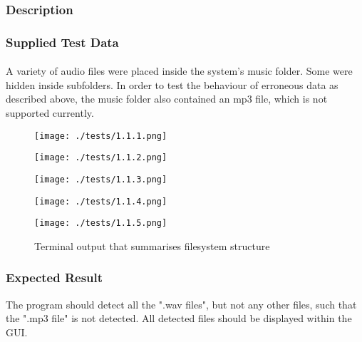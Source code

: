 \subsubsection{Description}
\paragraph{}
{
	\centering
}

\subsubsection{Supplied Test Data}
\paragraph{}
A variety of audio files were placed inside the system's music folder. Some were hidden inside subfolders. In order to test the behaviour of erroneous data as described above, the music folder also contained an mp3 file, which is not supported currently.

\begin{figure}[H]
	\texttt{[image: ./tests/1.1.1.png]}
\end{figure}
\begin{figure}[H]
	\texttt{[image: ./tests/1.1.2.png]}
\end{figure}
\begin{figure}[H]
	\texttt{[image: ./tests/1.1.3.png]}
\end{figure}
\begin{figure}[H]
	\texttt{[image: ./tests/1.1.4.png]}
\end{figure}
\begin{figure}[H]
	\texttt{[image: ./tests/1.1.5.png]}
	\caption{Terminal output that summarises filesystem structure}
\end{figure}

\subsubsection{Expected Result}
The program should detect all the ".wav files", but not any other files, such that the ".mp3 file" is not detected. All detected files should be displayed within the GUI.

